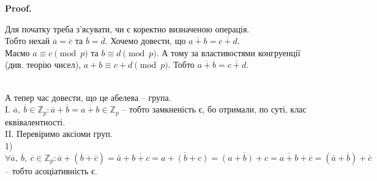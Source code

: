 \documentclass[a4paper, 10pt]{article}
\makeatletter
\theoremstyle{theoremdd}
\theoremstyle{theoremdd}
\theoremstyle{theoremdd}
\theoremstyle{theoremdd}
\theoremstyle{theoremdd}
\newtheorem{example}[theorem]{Example}
\theoremstyle{theoremdd}
\theoremstyle{theoremdd}
\theoremstyle{theoremdd}
\theoremstyle{theoremdd}
\theoremstyle{theoremdd}
\theoremstyle{theoremdd}
\theoremstyle{theoremdd}
\theoremstyle{theoremdd}
\theoremstyle{theoremdd}
\theoremstyle{theoremdd}
\renewenvironment{proof}[1][Proof.\\]{\par
\pushQED{\hfill \qed}%
\normalfont \topsep6\p@\@plus6\p@\relax
\trivlist
\item\relax
{\bfseries
#1\@addpunct{.}}\hspace\labelsep\ignorespaces
}{%
\popQED\endtrivlist\@endpefalse
}
\makeatother
\begin{document}
\begin{proof}
Для початку треба з'ясувати, чи є коректно визначеною операція.\\
Тобто нехай $\overline{a} = \overline{c}$ та $\overline{b} = \overline{d}$. Хочемо довести, що $\overline{a+b} = \overline{c+d}$.\\
Маємо $a \equiv c \pmod p$ та $b \equiv d \pmod p$. А тому за властивостями конгруенції (див. теорію чисел), $a+b \equiv c+d \pmod p$. Тобто $\overline{a+b} = \overline{c+d}$.
\iffalse
Перш за все необхідно показати, що визначена операція коректна.
\begin{example}
На конкретному прикладі візьмемо множину $\mathbb{Z}_5$.\\
Ми хочемо, щоб $\overline{1} + \overline{2} = \overline{3}$. Для коректної рівності нам необхідно, щоб кожний елемент з $\overline{1}$ плюс кожний елемент з $\overline{2}$ обов'язково став елементом, що завжди потрапить в $\overline{3}$. Якщо тут розписати множині один за одним, то там все виконується на око.\\
Математично кажучи, $\begin{cases} x \in \overline{m} \\ y \in \overline{n} \end{cases} \implies x+y \in \overline{m+n}$.\\
Перефразувавши: $\begin{cases} x \equiv m \pmod p \\ y \equiv n \pmod p \end{cases} \implies x+y \equiv m+n \pmod p$.
\end{example}
Насправді кажучи, це властивість з теорії чисел про дільність за модулем, тому все в нас коректно визначено.
\fi
\bigskip \\
А тепер час довести, що це абелева -- група.\\
I. $\overline{a},\ \overline{b} \in \mathbb{Z}_p: \overline{a}+\overline{b} = \overline{a+b} \in \mathbb{Z}_p$ -- тобто замкненість є, бо отримали, по суті, клас еквівалентності.\\
II. Перевіримо аксіоми груп.\\
1) $\forall \overline{a},\ \overline{b},\ \overline{c} \in \mathbb{Z}_p: \overline{a}+(\overline{b}+\overline{c}) = \overline{a}+\overline{b+c} = \overline{a+(b+c)} = \overline{(a+b)+c} = \overline{a+b} + \overline{c} = (\overline{a}+\overline{b})+\overline{c}$ -- тобто асоціативність є.\\

\end{proof}
\end{document}

